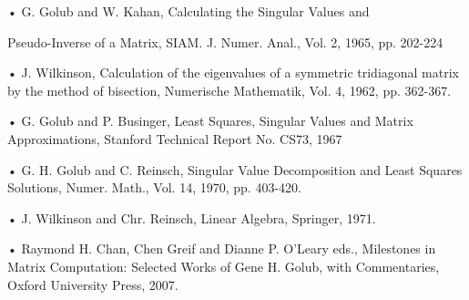 	\setLTRbibitems
	\begin{thebibliography}{9}
• G. Golub and W. Kahan, Calculating the Singular Values and

Pseudo-Inverse of a Matrix, SIAM. J. Numer. Anal., Vol. 2, 1965, pp.
202-224

• J. Wilkinson, Calculation of the eigenvalues of a symmetric tridiagonal
matrix by the method of bisection, Numerische Mathematik, Vol. 4, 1962,
pp. 362-367.

• G. Golub and P. Businger, Least Squares, Singular Values and Matrix
Approximations, Stanford Technical Report No. CS73, 1967

• G. H. Golub and C. Reinsch, Singular Value Decomposition and Least
Squares Solutions, Numer. Math., Vol. 14, 1970, pp. 403-420.

• J. Wilkinson and Chr. Reinsch, Linear Algebra, Springer, 1971.

• Raymond H. Chan, Chen Greif and Dianne P. O’Leary eds., Milestones in
Matrix Computation: Selected Works of Gene H. Golub, with
Commentaries, Oxford University Press, 2007.
	
	\end{thebibliography}